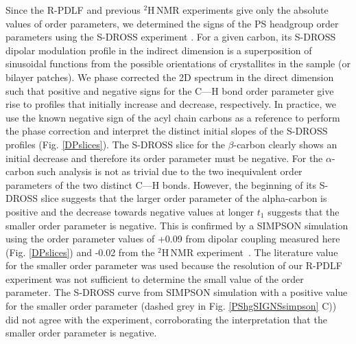 \documentclass[aps,prl,superscriptaddress,twocolumn]{revtex4}
\begin{document}
Since the R-PDLF and previous $^2$H\,NMR experiments \cite{browning80,roux91} give 
only the absolute values of order parameters, we determined the signs of the PS headgroup
order parameters using the S-DROSS experiment \cite{gross97}.
For a given carbon, its S-DROSS dipolar modulation profile in the indirect dimension is a superposition
of sinusoidal functions from the possible orientations of crystallites in the sample (or bilayer patches).
We phase corrected the 2D spectrum in the direct dimension such that positive and negative signs for the C—H
bond order parameter give rise to profiles that initially increase and decrease, respectively.
In practice, we use the known negative sign of the acyl chain carbons as a reference to perform
the phase correction and interpret the distinct initial slopes of the S-DROSS profiles (Fig. \ref{DPslices}). 
The S-DROSS slice for the $\beta$-carbon clearly shows an initial decrease and therefore its order parameter must be negative.
For the $\alpha$-carbon such analysis is not as trivial due to the two inequivalent order parameters of the two distinct C—H bonds.
However, the beginning of its S-DROSS slice suggests that the larger order parameter of the alpha-carbon is positive and the
decrease towards negative values at longer $t_1$ suggests that the smaller order parameter is negative.    
%
%
This is confirmed by a SIMPSON simulation
using the order parameter values of +0.09 from dipolar coupling measured here (Fig. \ref{DPslices})
and -0.02 from the $^2$H\,NMR experiment~\cite{roux91}.
The literature value for the smaller order parameter was used because the
resolution of our R-PDLF experiment was not sufficient to determine the
small value of the order parameter.
The S-DROSS curve from SIMPSON simulation with a positive value for the smaller order parameter
(dashed grey in Fig. \ref{PShgSIGNSsimpson} C)) did not agree with the experiment, 
corroborating the interpretation that the smaller order parameter is negative.
\end{document}
